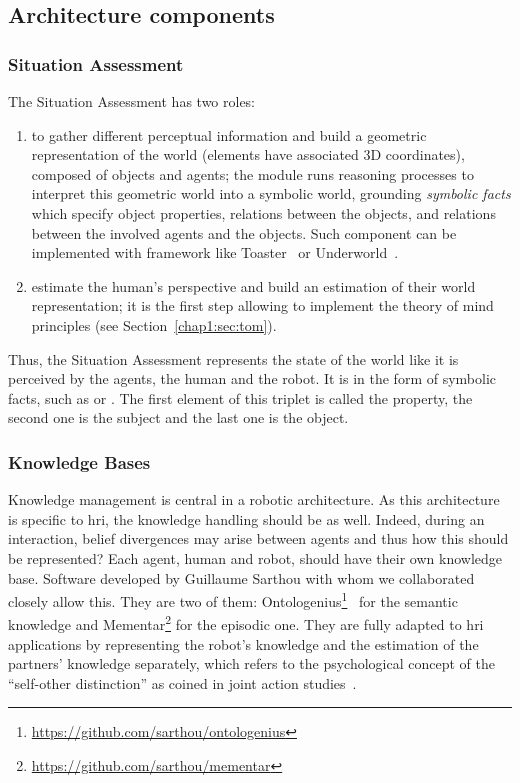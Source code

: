 \documentclass[a4paper,11pt,twoside]{StyleThese}
\begin{document}
\subsection{Architecture components}

\subsubsection{Situation Assessment}\label{chap3:subsubsec:sa}
The Situation Assessment has two roles:
\begin{enumerate}
	\item  to gather different perceptual information and build a geometric representation of the world (\ie elements have associated 3D coordinates), composed of objects and agents; the module runs reasoning processes to interpret this geometric world into a symbolic world, grounding \emph{symbolic facts} which specify object properties, relations between the objects, and relations between the involved agents and the objects. Such component can be implemented with framework like Toaster~\cite{milliez_2014_framework} or Underworld~\cite{lemaignan_2018_underworlds}.
	\item estimate the human's perspective and build an estimation of their world representation; it is the first step allowing to implement the theory of mind principles (see Section~\ref{chap1:sec:tom}).
\end{enumerate}

Thus, the Situation Assessment represents the state of the world like it is perceived by the agents, the human and the robot. It is in the form of symbolic facts, such as  or . The first element of this triplet is called the property, the second one is the subject and the last one is the object.

\subsubsection{Knowledge Bases}\label{chap3:subsubsec:kb}

Knowledge management is central in a robotic architecture. As this architecture is specific to \acrshort{hri}, the knowledge handling should be as well. Indeed, during an interaction, belief divergences may arise between agents and thus how this should be represented? Each agent, human and robot, should have their own knowledge base. Software developed by Guillaume Sarthou with whom we collaborated closely allow this. They are two of them: Ontologenius\footnote{\url{https://github.com/sarthou/ontologenius}}~\cite{sarthou_2019_ontologenius} for the semantic knowledge and Mementar\footnote{\url{https://github.com/sarthou/mementar}} for the episodic one. They are fully adapted to \acrshort{hri} applications by representing the robot's knowledge and the estimation of the partners' knowledge separately, which refers to the psychological concept of the ``self-other distinction'' as coined in joint action studies~\cite{pacherie_2012_agency}.  
\end{document}
